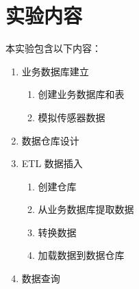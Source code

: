 \section{实验内容}
本实验包含以下内容：
\begin{enumerate}
    \item 业务数据库建立
    \begin{enumerate}
        \item 创建业务数据库和表
        \item 模拟传感器数据
    \end{enumerate}
    \item 数据仓库设计
    \item ETL 数据插入
    \begin{enumerate}
        \item 创建仓库
        \item 从业务数据库提取数据
        \item 转换数据
        \item 加载数据到数据仓库
    \end{enumerate}
    \item 数据查询
\end{enumerate}